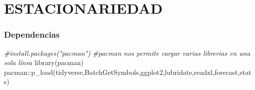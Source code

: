 \documentclass[
]{book}
\newenvironment{Shaded}{\begin{snugshade}}{\end{snugshade}}
\newcommand{\CommentTok}[1]{\textcolor[rgb]{0.56,0.35,0.01}{\textit{#1}}}
\newcommand{\FunctionTok}[1]{\textcolor[rgb]{0.00,0.00,0.00}{#1}}
\newcommand{\NormalTok}[1]{#1}
\newcommand{\SpecialCharTok}[1]{\textcolor[rgb]{0.00,0.00,0.00}{#1}}
\begin{document}
\hypertarget{estacionariedad}{%
\chapter{ESTACIONARIEDAD}\label{estacionariedad}}

\hypertarget{dependencias-2}{%
\subsection{Dependencias}\label{dependencias-2}}

\begin{Shaded}
\begin{Highlighting}[]
\CommentTok{\#install.packages("pacman")}
\CommentTok{\#pacman nos permite cargar varias librerias en una sola línea}
\FunctionTok{library}\NormalTok{(pacman)}
\NormalTok{pacman}\SpecialCharTok{::}\FunctionTok{p\_load}\NormalTok{(tidyverse,BatchGetSymbols,ggplot2,lubridate,readxl,forecast,stats)}
\end{Highlighting}
\end{Shaded}
\end{document}
